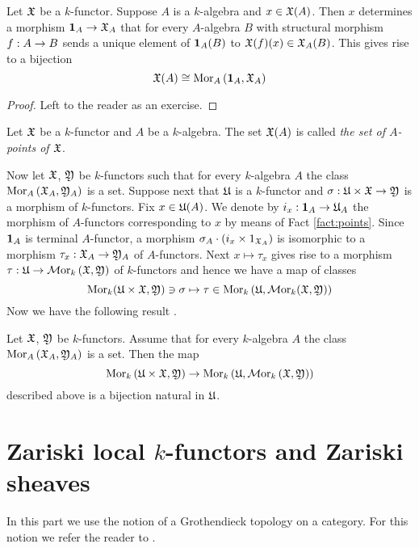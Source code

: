 \begin{fact}\label{fact:points}
Let ${\mathfrak X}$ be a $k$-functor. Suppose $A$ is a $k$-algebra and $x\in {\mathfrak X}(A)$. Then $x$ determines a morphism $\mathbf{1}_{A}\rightarrow {\mathfrak X}_A$ that for every $A$-algebra $B$ with structural morphism $f:A\rightarrow B$ sends a unique element of $\mathbf{1}_{A}(B)$ to ${\mathfrak X}(f)(x)\in {\mathfrak X}_A(B)$. This gives rise to a bijection
$${\mathfrak X}(A)\cong \mathrm{Mor}_{A}\left(\mathbf{1}_{A},{\mathfrak X}_A\right)$$
\end{fact}
\begin{proof}
Left to the reader as an exercise.
\end{proof}

\begin{definition}
Let ${\mathfrak X}$ be a $k$-functor and $A$ be a $k$-algebra. The set ${\mathfrak X}(A)$ is called \textit{the set of $A$-points of ${\mathfrak X}$}.
\end{definition}
\noindent
Now let ${\mathfrak X}$, ${\mathfrak Y}$ be $k$-functors such that for every $k$-algebra $A$ the class $\mathrm{Mor}_A\left({\mathfrak X}_A,{\mathfrak Y}_A\right)$ is a set. Suppose next that ${\mathfrak U}$ is a $k$-functor and $\sigma:{\mathfrak U}\times {\mathfrak X}\rightarrow {\mathfrak Y}$ is a morphism of $k$-functors. Fix $x\in {\mathfrak U}(A)$. We denote by $i_x:\mathbf{1}_A\rightarrow {\mathfrak U}_A$ the morphism of $A$-functors corresponding to $x$ by means of Fact \ref{fact:points}. Since $\mathbf{1}_A$ is terminal $A$-functor, a morphism $\sigma_A\cdot \left(i_x\times 1_{{\mathfrak X}_A}\right)$ is isomorphic to a morphism $\tau_x:{\mathfrak X}_A\rightarrow {\mathfrak Y}_A$ of $A$-functors. Next $x\mapsto \tau_x$ gives rise to a morphism $\tau:{\mathfrak U}\rightarrow \mathcal{M}\mathrm{or}_k\left({\mathfrak X},{\mathfrak Y}\right)$ of $k$-functors and hence we have a map of classes
$$\mathrm{Mor}_k({\mathfrak U}\times {\mathfrak X},{\mathfrak Y})\ni \sigma\mapsto \tau\in \mathrm{Mor}_k\left({\mathfrak U},\mathcal{M}\mathrm{or}_k({\mathfrak X},{\mathfrak Y})\right)$$
Now we have the following result {\cite[Theorem 5.3]{Presheaves}}.

\begin{theorem}\label{theorem:homforkfunctors}
Let ${\mathfrak X}$, ${\mathfrak Y}$ be $k$-functors. Assume that for every $k$-algebra $A$ the class $\mathrm{Mor}_{A}\left({\mathfrak X}_A,{\mathfrak Y}_A\right)$ is a set. Then the map 
$$\mathrm{Mor}_{k}\left({\mathfrak U}\times {\mathfrak X},{\mathfrak Y}\right)\rightarrow  \mathrm{Mor}_{k}\left({\mathfrak U},\mathcal{M}\mathrm{or}_{k}\left({\mathfrak X},{\mathfrak Y}\right)\right)$$
described above is a bijection natural in ${\mathfrak U}$. 
\end{theorem}

\section{Zariski local $k$-functors and Zariski sheaves}
\noindent
In this part we use the notion of a Grothendieck topology on a category. For this notion we refer the reader to \cite{Sheaves}.

